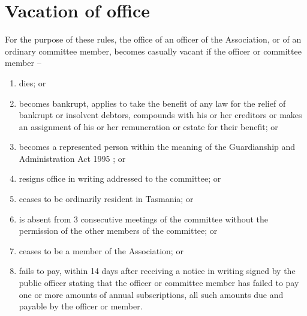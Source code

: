 \documentclass[a4paper,11pt]{article}
\begin{document}
\section{Vacation of office}
For the purpose of these rules, the office of an officer of the Association, or of an ordinary committee member, becomes casually vacant if the officer or committee member --
\begin{enumerate}
	\item dies; or
	\item becomes bankrupt, applies to take the benefit of any law for the relief of bankrupt or insolvent debtors, compounds with his or her creditors or makes an assignment of his or her remuneration or estate for their benefit; or
	\item becomes a represented person within the meaning of the Guardianship and Administration Act 1995 ; or
	\item resigns office in writing addressed to the committee; or
	\item ceases to be ordinarily resident in Tasmania; or
	\item is absent from 3 consecutive meetings of the committee without the permission of the other members of the committee; or
	\item ceases to be a member of the Association; or
	\item fails to pay, within 14 days after receiving a notice in writing signed by the public officer stating that the officer or committee member has failed to pay one or more amounts of annual subscriptions, all such amounts due and payable by the officer or member.
\end{enumerate}
\end{document}
